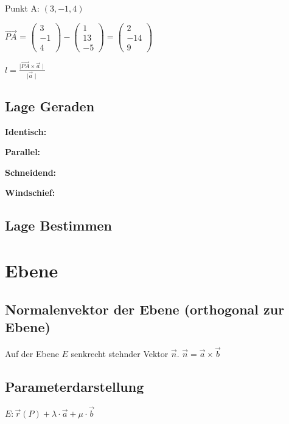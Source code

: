 \begin{multicols*}{3}
    {Punkt A: $(3,-1,4)$}

    {$\overrightarrow{PA}$ = $\begin{pmatrix}
                3  \\
                -1 \\
                4
            \end{pmatrix} -  \begin{pmatrix}
                1  \\
                13 \\
                -5
            \end{pmatrix} =
            \begin{pmatrix}
                2   \\
                -14 \\
                9
            \end{pmatrix} $}

    {$l = \frac {\mid \overrightarrow{PA} \times\vec{a}\mid}{\mid\vec{a}\mid} $}

    \subsection{Lage Geraden}

    \textbf{Identisch:}

    \textbf{Parallel:}

    \textbf{Schneidend:}

    \textbf{Windschief:}

    \subsection{Lage Bestimmen}


    \section{Ebene}
    \subsection{Normalenvektor der Ebene (orthogonal zur Ebene)}
    {Auf der Ebene $ E $ senkrecht stehnder Vektor $\vec{n}$.}
    $\vec{n} = \vec{a} \times \vec{b}$

    \subsection{Parameterdarstellung}

    {\large $ E: \vec{r}(P) + \lambda \cdot \vec{a} + \mu \cdot \vec{b} $}


\end{multicols*}
